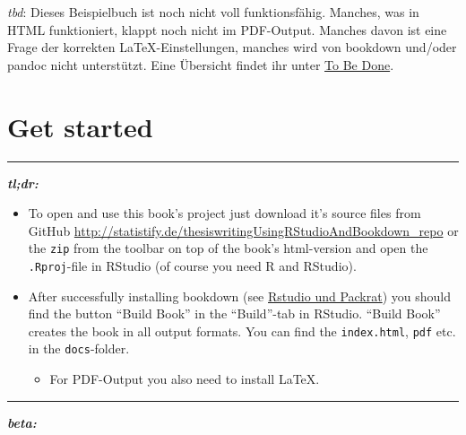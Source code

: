 \documentclass[]{book}
\providecommand{\tightlist}{%
  \setlength{\itemsep}{0pt}\setlength{\parskip}{0pt}}
\theoremstyle{definition}
\theoremstyle{definition}
\theoremstyle{remark}
\let\BeginKnitrBlock\begin \let\EndKnitrBlock\end
\begin{document}
\BeginKnitrBlock{rmdcaution}
\emph{tbd}: Dieses Beispielbuch ist noch nicht voll funktionsfähig.
Manches, was in HTML funktioniert, klappt noch nicht im PDF-Output.
Manches davon ist eine Frage der korrekten LaTeX-Einstellungen, manches
wird von bookdown und/oder pandoc nicht unterstützt. Eine Übersicht
findet ihr unter \protect\hyperlink{tbd}{To Be Done}.
\EndKnitrBlock{rmdcaution}

\section*{Get started}\label{get-started}

\begin{center}\rule{0.5\linewidth}{\linethickness}\end{center}

\textbf{\emph{tl;dr:}}

\begin{itemize}
\item
  To open and use this book's project just download it's source files
  from GitHub
  \url{http://statistify.de/thesiswritingUsingRStudioAndBookdown_repo}
  or the \texttt{zip} from the toolbar on top of the book's html-version
  and open the \texttt{.Rproj}-file in RStudio (of course you need R and
  RStudio).
\item
  After successfully installing bookdown (see
  \protect\hyperlink{rstudio-und-packrat}{Rstudio und Packrat}) you
  should find the button ``Build Book'' in the ``Build''-tab in RStudio.
  ``Build Book'' creates the book in all output formats. You can find
  the \texttt{index.html}, \texttt{pdf} etc. in the
  \texttt{docs}-folder.

  \begin{itemize}
  \tightlist
  \item
    For PDF-Output you also need to install LaTeX.
  \end{itemize}
\end{itemize}

\begin{center}\rule{0.5\linewidth}{\linethickness}\end{center}

\textbf{\emph{beta:}}
\end{document}
